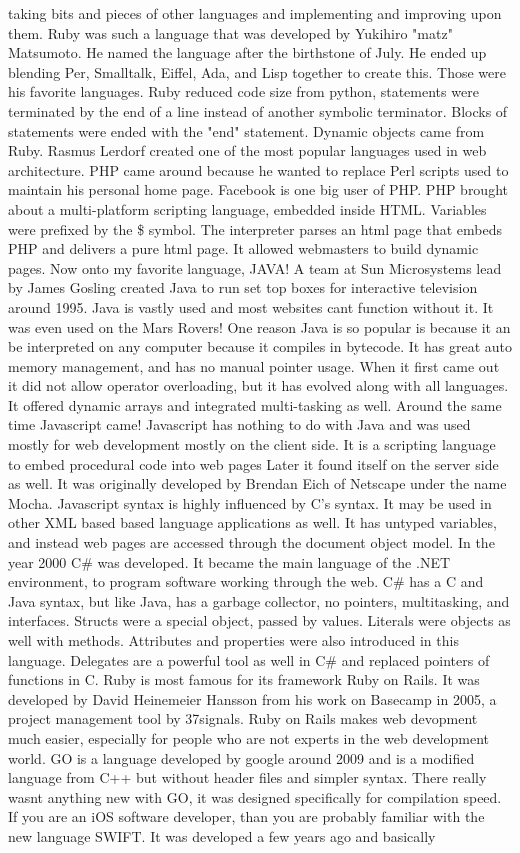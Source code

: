 \documentclass[letterpaper, 10 pt, conference]{IEEEtran}
\begin{document}
taking bits and pieces of other languages and implementing and improving upon them. Ruby was such a language that was developed by Yukihiro "matz" Matsumoto. He named the language after the birthstone of July. He ended up blending Per, Smalltalk, Eiffel, Ada, and Lisp together to create this. Those were his favorite languages. Ruby reduced code size from python, statements were terminated by the end of a line instead of another symbolic terminator. Blocks of statements were ended with the "end" statement. Dynamic objects came from Ruby. Rasmus Lerdorf created one of the most popular languages used in web architecture. PHP came around because he wanted to replace Perl scripts used to maintain his personal home page. Facebook is one big user of PHP. PHP brought about a multi-platform scripting language, embedded inside HTML. Variables were prefixed by the \$ symbol. The interpreter parses an html page that embeds PHP and delivers a pure html page. It allowed webmasters to build dynamic pages. Now onto my favorite language, JAVA! A team at Sun Microsystems lead by James Gosling created Java to run set top boxes for interactive television around 1995. Java is vastly used and most websites cant function without it. It was even used on the Mars Rovers! One reason Java is so popular is because it an be interpreted on any computer because it compiles in bytecode. It has great auto memory management, and has no manual pointer usage. When it first came out it did not allow operator overloading, but it has evolved along with all languages. It offered dynamic arrays and integrated multi-tasking as well. Around the same time Javascript came! Javascript has nothing to do with Java and was used mostly for web development mostly on the client side. It is a scripting language to embed procedural code into web pages Later it found itself on the server side as well. It was originally developed by Brendan Eich of Netscape under the name Mocha. Javascript syntax is highly influenced by C's syntax. It may be used in other XML based based language applications as well. It has untyped variables, and instead web pages are accessed through the document object model. In the year 2000 C\# was developed. It became the main language of the .NET environment, to program software working through the web. C\# has a C and Java syntax, but like Java, has a garbage collector, no pointers, multitasking, and interfaces. Structs were a special object, passed by values. Literals were objects as well with methods. Attributes and properties were also introduced in this language. Delegates are a powerful tool as well in C\# and replaced pointers of functions in C. Ruby is most famous for its framework Ruby on Rails. It was developed by David Heinemeier Hansson from his work on Basecamp in 2005, a project management tool by 37signals. Ruby on Rails makes web devopment much easier, especially for people who are not experts in the web development world. GO is a language developed by google around 2009 and is a modified language from C++ but without header files and simpler syntax. There really wasnt anything new with GO, it was designed specifically for compilation speed. If you are an iOS software developer, than you are probably familiar with the new language SWIFT. It was developed a few years ago and basically 
\end{document}
